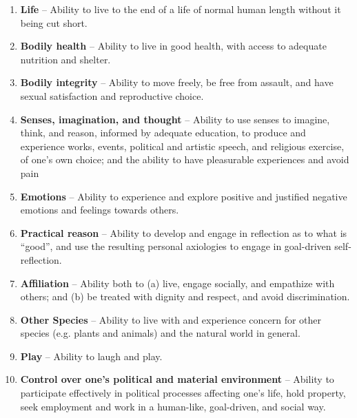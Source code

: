 \documentclass[letterpaper]{article} %
\begin{document}
\begin{enumerate}
\item \textbf{Life} -- Ability to live to the end of a life of normal human length without it being cut short.
\item \textbf{Bodily health} -- Ability to live in good health, with access to adequate nutrition and shelter.
\item \textbf{Bodily integrity} -- Ability to move freely, be free from assault, and have sexual satisfaction and reproductive choice.
\item \textbf{Senses, imagination, and thought} -- Ability to use senses to imagine, think, and reason,
informed by adequate education,
to produce and experience works, events, political and artistic speech, and religious exercise, of one's own choice; and the ability to have pleasurable experiences and avoid pain
\item \textbf{Emotions} -- Ability to experience and explore positive and justified negative emotions and feelings towards others. %
\item \textbf{Practical reason} -- Ability to develop and engage in reflection as to what is ``good'', and use the resulting personal axiologies to engage in goal-driven self-reflection.
\item \textbf{Affiliation} -- Ability both to (a) live, engage socially, and empathize with others; and (b) be treated with dignity and respect, and avoid discrimination.
\item \textbf{Other Species} -- Ability to live with and experience concern for other species (e.g. plants and animals) and the natural world in general.
\item \textbf{Play} -- Ability to laugh and play.
\item \textbf{Control over one's political and material environment} --
Ability to participate effectively in political processes affecting one's life, hold property, seek employment and work in a human-like, goal-driven, and social way.
\end{enumerate}
\end{document}
